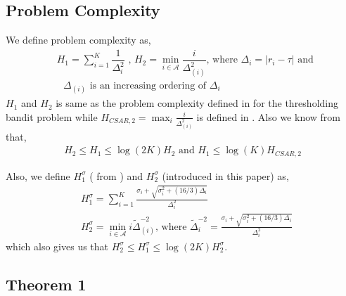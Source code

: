 \subsection{Problem Complexity}

We define problem complexity as,
\begin{align*}
& H_{1} = \sum_{i=1}^{K}\dfrac{1}{\Delta_{i}^{2}} \text{ ,   } H_{2}=\min_{i\in \mathcal{A}}\dfrac{i}{{\Delta_{(i)}^{2}}} \text{, where } \Delta_{i}=|r_{i}-\tau| \text{ and }\\
& \text{ $\Delta_{(i)}$ is an increasing ordering of $\Delta_i$ }
\end{align*}
$H_1$ and $H_2$ is same as the problem complexity defined in \cite{locatelli2016optimal} for the thresholding bandit problem while $H_{CSAR,2}=\max_{i}\frac{i}{\Delta_{(i)}^2}$ is defined in \cite{chen2014combinatorial}. Also we know from \cite{locatelli2016optimal} that,
\begin{align*}
H_{2}\leq H_{1}\leq \log(2K)H_{2} \text{ and } H_1 \leq \log(K)H_{CSAR,2}
\end{align*}

Also, we define $H_{1}^{\sigma}$ ( from \cite{gabillon2011multi}) and $H_{2}^{\sigma}$ (introduced in this paper) as,
\begin{align*}
& H_{1}^{\sigma}=\sum_{i=1}^{K}\frac{\sigma_{i}+\sqrt{\sigma_{i}^{2}+(16/3)\Delta_{i}}}{\Delta_{i}^{2}}\\
& H_{2}^{\sigma}=\min_{i\in \mathcal{A}} i\tilde{\Delta}_{(i)}^{-2} \text{, where } \tilde{\Delta}_{i}^{-2}=\frac{\sigma_{i}+\sqrt{\sigma_{i}^{2}+(16/3)\Delta_{i}}}{\Delta_{i}^{2}}
\end{align*}
which also gives us that $H_{2}^{\sigma} \leq H_{1}^{\sigma} \leq \log(2K) H_{2}^{\sigma}$.


\subsection{Theorem 1}

